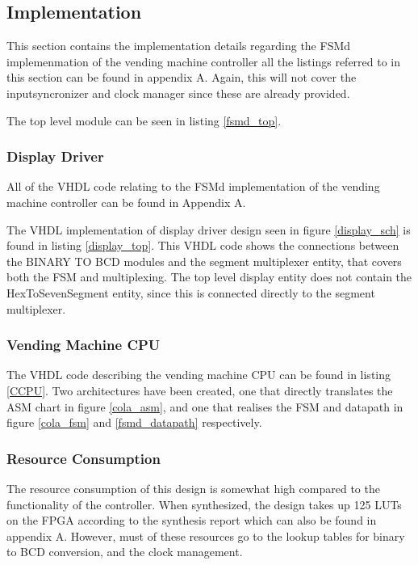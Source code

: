 \subsection{Implementation}
This section contains the implementation details regarding the FSMd implemenmation of the vending machine controller all the listings referred to in this section can be found in appendix A.
Again, this will not cover the inputsyncronizer and clock manager since these are already provided. 

The top level module can be seen in listing \ref{fsmd_top}.
\subsubsection{Display Driver}
All of the VHDL code relating to the FSMd implementation of the vending machine controller can be found in Appendix A. 
%

The VHDL implementation of display driver design seen in figure \ref{display_sch} is found in listing 
\ref{display_top}.
This VHDL code shows the connections between the BINARY TO BCD modules and the segment multiplexer entity, that covers both the FSM and multiplexing.
The top level display entity does not contain the HexToSevenSegment entity, since this is connected directly to the segment multiplexer.

\subsubsection{Vending Machine CPU}
The VHDL code describing the vending machine CPU can be found in listing \ref{CCPU}.
Two architectures have been created, one that directly translates the ASM chart in figure \ref{cola_asm}, and one that realises the FSM and datapath in figure \ref{cola_fsm} and \ref{fsmd_datapath} respectively.
%

\subsubsection{Resource Consumption}
The resource consumption of this design is somewhat high compared to the functionality of the controller.
When synthesized, the design takes up 125 LUTs on the FPGA according to the synthesis report which can also be found in appendix A.
However, must of these resources go to the lookup tables for binary to BCD conversion, and the clock management.
